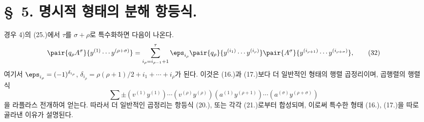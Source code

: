 
\section*{\S\ 5. 명시적 형태의 분해 항등식.}
경우 4)의 (25.)에서 $\tau$를 $\sigma+\rho$로 특수화하면 다음이 나온다.
\begin{equation}
 \pair{q_\rho A^\sigma}{y^{(1)}\cdots y^{(\rho+\sigma)}}
 =\sum_{i_\rho=i_{\rho-1}+1}^{\tau}
 \eps_{i_\rho}\pair{q_\rho}{y^{(i_1)}\cdots y^{(i_\rho)}}
 \pair{A^\sigma}{y^{(i_{\rho+1})}\cdots y^{(i_{\rho+\sigma})}},
\tag{32}
\end{equation}
여기서 $\eps_{i_\rho}=(-1)^{\delta_{i_\rho}}$, $\delta_{i_\rho}=\rho(\rho+1)/2+i_1+\cdots+i_\rho$가 된다. 이것은 (16.)과 (17.)보다 더 일반적인 형태의 행렬 곱정리이며, 곱행렬의 행렬식
\[
 \sum\pm(v^{(1)}y^{(1)})\cdots(v^{(\rho)}y^{(\rho)})(a^{(1)}y^{(\rho+1)})\cdots(a^{(\sigma)}y^{(\rho+\sigma)})
\]
을 라플라스 전개하여 얻는다. 따라서 더 일반적인 곱정리는 항등식 (20.), 또는 각각 (21.)로부터 합성되며, 이로써 특수한 형태 (16.), (17.)을 따로 골라낸 이유가 설명된다.

